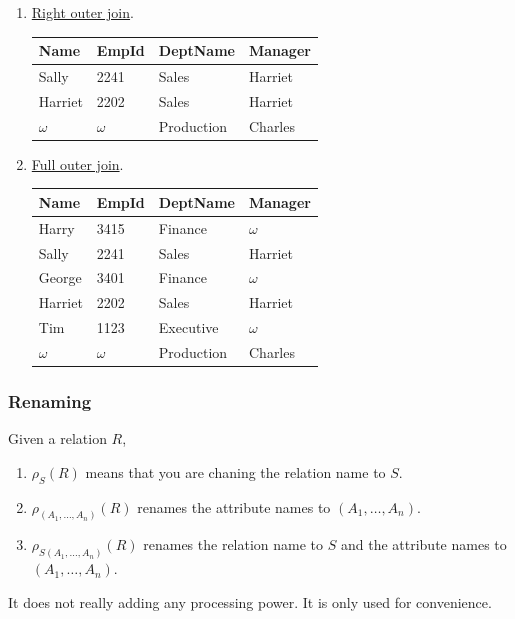 \begin{example}
\begin{enumerate}
        \item \hyperref[def:right-outer-join]{Right outer join}. 

        \begin{center}
          \begin{tabular}{|l|l|l|l|}
          \hline
          Name & EmpId & DeptName & Manager \\
          \hline
          Sally & 2241 & Sales & Harriet \\
          Harriet & 2202 & Sales & Harriet \\
          $\omega$ & $\omega$ & Production & Charles \\
          \hline
          \end{tabular}
        \end{center}

        \item \hyperref[def:full-outer-join]{Full outer join}. 
        \begin{center}
          \begin{tabular}{|l|l|l|l|}
          \hline
          Name & EmpId & DeptName & Manager \\
          \hline
          Harry & 3415 & Finance & $\omega$ \\
          Sally & 2241 & Sales & Harriet \\
          George & 3401 & Finance & $\omega$ \\
          Harriet & 2202 & Sales & Harriet \\
          Tim & 1123 & Executive & $\omega$ \\
          $\omega$ & $\omega$ & Production & Charles \\
          \hline
          \end{tabular}
        \end{center}
      \end{enumerate}
    \end{example}

  \subsubsection{Renaming}

    \begin{definition}[Renaming]
      \label{def:renaming}
      Given a relation $R$, 
      \begin{enumerate}
        \item $\rho_S (R)$ means that you are chaning the relation name to $S$. 
        \item $\rho_{(A_1, \ldots, A_n)} (R)$ renames the attribute names to $(A_1, \ldots, A_n)$. 
        \item $\rho_{S(A_1, \ldots, A_n)} (R)$ renames the relation name to $S$ and the attribute names to $(A_1, \ldots, A_n)$. 
      \end{enumerate}
      It does not really adding any processing power. It is only used for convenience. 
    \end{definition}

